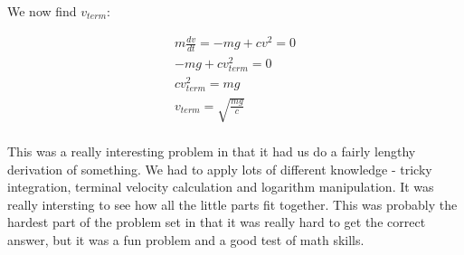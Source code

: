 \documentclass[10pt]{article} %
\begin{document}
We now find $v_{term}$:

\begin{align}
  m\frac{dv}{dt} = -mg + cv^2 = 0\\
  -mg + cv_{term}^2 = 0\\
  cv_{term}^2 = mg\\
  v_{term} = \sqrt{\frac{mg}{c}}\\
\end{align}

This was a really interesting problem in that it had us do a fairly lengthy derivation of something. We had to apply lots of different knowledge - tricky integration, terminal velocity calculation and logarithm manipulation. It was really intersting to see how all the little parts fit together. This was probably the hardest part of the problem set in that it was really hard to get the correct answer, but it was a fun problem and a good test of math skills.\\
\end{document}
